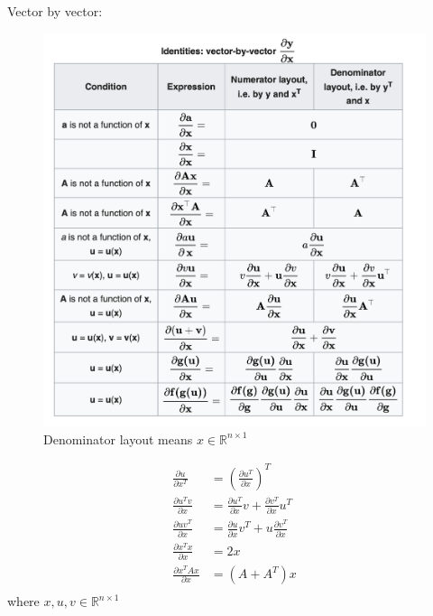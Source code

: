\documentclass[11pt]{elegantbook}
\begin{document}
Vector by vector:
\begin{center}\begin{figure}[htbp]
    \centering
    \includegraphics[scale=0.25]{vector_by_vector.png}
    \caption{Denominator layout means $x\in\mathbb{R}^{n\times 1}$}
    \label{}
\end{figure}\end{center}

\begin{equation}
    \begin{aligned}
        \frac{\partial u}{\partial x^T}&=(\frac{\partial u^T}{\partial x})^T\\
        \frac{\partial u^Tv}{\partial x}&=\frac{\partial u^T}{\partial x}v+\frac{\partial v^T}{\partial x}u^T\\
        \frac{\partial uv^T}{\partial x}&=\frac{\partial u}{\partial x}v^T+u\frac{\partial v^T}{\partial x}\\
        \frac{\partial x^Tx}{\partial x}&=2x\\
        \frac{\partial x^TAx}{\partial x}&=(A+A^T)x\\
    \end{aligned}
    \nonumber
\end{equation}
where $x,u,v\in \mathbb{R}^{n\times 1}$
\end{document}
